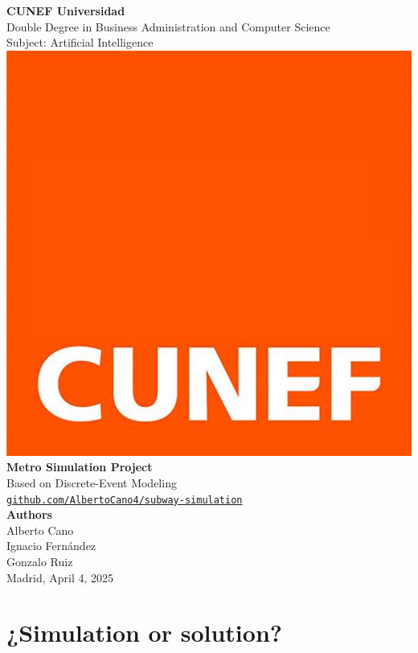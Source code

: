 \documentclass[a4paper,11pt,oneside]{book}
\begin{document}
\frontmatter

\begin{titlepage}
    \begin{center}

        {\LARGE \textbf{CUNEF Universidad}}\\[0.4cm]
        {\large Double Degree in Business Administration and Computer Science}\\
        {\large Subject: Artificial Intelligence}\\[2cm]

        \includegraphics[width=0.35\linewidth]{Latex code/chapters/cunef.jpg}\\[2.5cm]

        {\Huge \textbf{Metro Simulation Project}}\\[0.4cm]
        {\Large Based on Discrete-Event Modeling}\\[1.2cm]

        \href{https://github.com/AlbertoCano4/subway-simulation}{\texttt{github.com/AlbertoCano4/subway-simulation}}\\[2cm]

        {\Large \textbf{Authors}}\\[0.3cm]
        {\large Alberto Cano\\
        Ignacio Fernández\\
        Gonzalo Ruiz}\\[2.5cm]

        \vfill
        {\large Madrid, April 4, 2025}

    \end{center}
\end{titlepage}

    \newpage
    \thispagestyle{empty}
    \chapter*{\centering \Large ¿Simulation or solution?}
\end{document}
